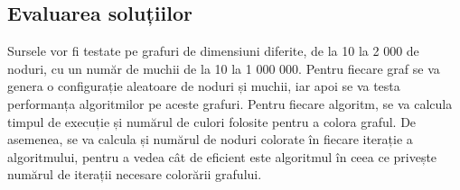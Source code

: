 \documentclass[runningheads]{llncs}
\begin{document}
\subsection{Evaluarea soluțiilor}
Sursele vor fi testate pe grafuri de dimensiuni diferite, de la 10 la 2 000 de noduri,
cu un număr de muchii de la 10 la 1 000 000. Pentru fiecare graf se va genera o
configurație aleatoare de noduri și muchii, iar apoi se va testa performanța
algoritmilor pe aceste grafuri. Pentru fiecare algoritm, se va calcula timpul de
execuție și numărul de culori folosite pentru a colora graful. De asemenea, se va
calcula și numărul de noduri colorate în fiecare iterație a algoritmului, pentru a
vedea cât de eficient este algoritmul în ceea ce privește numărul de iterații
necesare colorării grafului.






\end{document}

